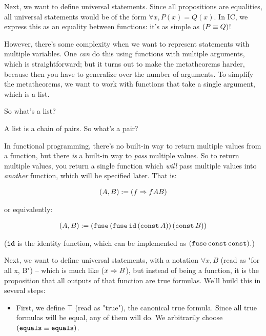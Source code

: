 \documentclass{article}
\begin{document}
  Next, we want to define universal statements. Since all propositions are equalities, all universal statements would be of the form $\forall x, P(x) = Q(x)$. In IC, we express this as an equality between functions: it's as simple as $(P \equiv Q)$!
  
  However, there's some complexity when we want to represent statements with multiple variables. One \emph{can} do this using functions with multiple arguments, which is straightforward; but it turns out to make the metatheorems harder, because then you have to generalize over the number of arguments. To simplify the metatheorems, we want to work with functions that take a single argument, which is a list.
  
  So what's a list?
  
  A list is a chain of pairs. So what's a pair?
  
  In functional programming, there's no built-in way to return multiple values from a function, but there \emph{is} a built-in way to \emph{pass} multiple values. So to return multiple values, you return a single function which \emph{will} pass multiple values into \emph{another} function, which will be specified later. That is:
  
  \begin{align*}
    (A, B) &:= (f \Rightarrow f A B)\\
  \end{align*}
  
  or equivalently:
  
  \begin{align*}
    (A, B) &:= (\operatorname{\texttt{fuse}}\, (\operatorname{\texttt{fuse}} \operatorname{\texttt{id}}\, (\operatorname{\texttt{const}} A))\, (\operatorname{\texttt{const}} B))\\
  \end{align*}
  
  ($\operatorname{\texttt{id}}$ is the identity function, which can be implemented as $(\operatorname{\texttt{fuse}}\operatorname{\texttt{const}}\operatorname{\texttt{const}})$.)

  
  Next, we want to define universal statements, with a notation $\forall x, B$ (read as "for all x, B") – which is much like ($x \Rightarrow B$), but instead of being a function, it is the proposition that all outputs of that function are true formulas. We'll build this in several steps:
   
  \begin{itemize}
    \item First, we define $\top$ (read as "true"), the canonical true formula. Since all true formulas will be equal, any of them will do. We arbitrarily choose $(\operatorname{\texttt{equals}} \equiv \operatorname{\texttt{equals}})$.
  \end{itemize}
  
\end{document}
